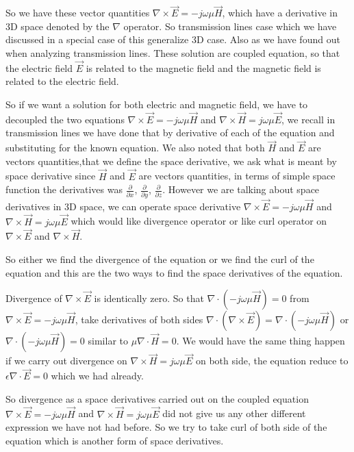 So we have these vector quantities $\nabla\times\vec{E}=-j\omega\mu\vec{H}$, which have a derivative in 3D space denoted by the $\nabla$ operator. So transmission lines case which we have discussed in a special case of this generalize 3D case. Also as we have found out when analyzing transmission lines. These solution are coupled equation, so that the electric field $\vec{E}$ is related to the magnetic field and the magnetic field is related to the electric field.

So if we want a solution for both electric and magnetic field, we have to decoupled the two equations  $\nabla\times\vec{E}=-j\omega\mu\vec{H}$ and $\nabla\times\vec{H}=j\omega\mu\vec{E}$,  we recall in transmission lines we have done that by derivative of each of the equation and substituting for the known equation. We also noted that both $\vec{H}$ and $\vec{E}$ are vectors quantities,that we define the space derivative, we ask what is meant by space derivative since $\vec{H}$ and $\vec{E}$ are vectors quantities, in terms of simple space function the derivatives was $\frac{\partial}{\partial x}$, $\frac{\partial}{\partial y}$, $\frac{\partial}{\partial z}$. However we are talking about space derivatives in 3D space, we can operate space derivative $\nabla\times\vec{E}=-j\omega\mu\vec{H}$ and $\nabla\times\vec{H}=j\omega\mu\vec{E}$ which would like divergence operator or like curl operator on $\nabla\times\vec{E}$ and $\nabla\times\vec{H}$. 

So either we find the divergence of the equation or we find the curl of the equation and this are the two ways to find the space derivatives of the equation.

Divergence of $\nabla\times\vec{E}$  is identically zero. So that $\nabla\cdot(-j\omega\mu\vec{H})=0$ from $\nabla\times\vec{E}=-j\omega\mu\vec{H}$, take derivatives of both sides $\nabla\cdot(\nabla\times\vec{E})=\nabla\cdot(-j\omega\mu\vec{H})$ or $\nabla\cdot(-j\omega\mu\vec{H})=0$  similar to $\mu\nabla\cdot\vec{H}=0$. We would have the same thing happen if we carry out divergence on $\nabla\times\vec{H}=j\omega\mu\vec{E}$ on both side, the equation reduce to $\epsilon\nabla\cdot\vec{E}=0$ which we had already.

So divergence as a space derivatives carried out on the coupled equation $\nabla\times\vec{E}=-j\omega\mu\vec{H}$ and $\nabla\times\vec{H}=j\omega\mu\vec{E}$ did not give us any other different expression we have not had before. So we try to take curl of both side of the equation which is another form of space derivatives.

